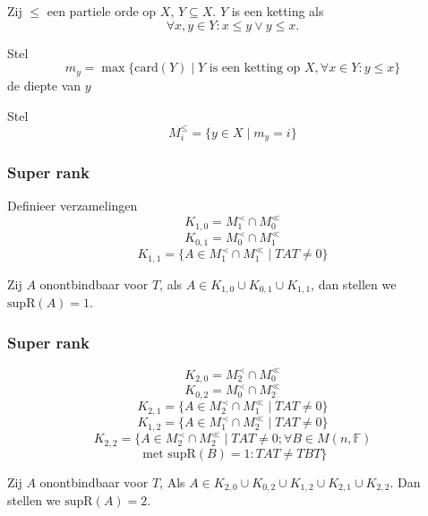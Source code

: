 \documentclass[12pt]{beamer}
\newcommand{\F}{\mathbb{F}}
\newcommand{\card}{\mathrm{card}}
\newcommand{\supR}{\mathrm{supR}}
\begin{document}
\begin{frame}
\frametitle{ $ $ }

\begin{block}{}
Zij $\leq$ een partiele orde op $X$, $Y \subseteq X$. $Y$ is een ketting als 
$$ \forall x,y \in Y : x \leq y \vee y \leq x .$$
\end{block}

\begin{block}{}
Stel 
$$m_y = \max \{ \card (Y) \; | \; Y \text{ is een ketting op } X, \forall x \in Y: y \leq x \}$$ 
de diepte van $y$
\end{block}

\begin{block}{}
Stel 
$$M_{i}^{\leq} = \{ y \in X \; | \; m_y = i\}$$
\end{block}

\end{frame}



\begin{frame}
\frametitle{Super rank}

\begin{block}{}
Definieer verzamelingen
$$K_{1,0} = M_{1}^{\prec} \cap M_{0}^{\ll}$$
$$K_{0,1} = M_{0}^{\prec} \cap M_{1}^{\ll}$$
$$K_{1,1} = \{ A \in M_{1}^{\prec} \cap M_{1}^{\ll} \; | \; TAT \neq 0  \}$$
\end{block}

\begin{block}{}
Zij $A$ onontbindbaar voor $T$, als $A \in K_{1,0} \cup K_{0,1} \cup K_{1,1}$, dan stellen we $\supR (A) = 1$.
\end{block}


\end{frame}

\begin{frame}
\frametitle{Super rank}

\begin{block}{}
$$K_{2,0} = M_{2}^{\prec} \cap M_{0}^{\ll}$$
$$K_{0,2} = M_{0}^{\prec} \cap M_{2}^{\ll}$$
$$K_{2,1} = \{ A \in M_{2}^{\prec} \cap M_{1}^{\ll} \; | \; TAT \neq 0  \}$$
$$K_{1,2} = \{ A \in M_{1}^{\prec} \cap M_{2}^{\ll} \; | \; TAT \neq 0  \}$$
$$K_{2,2} = \{ A \in M_{2}^{\prec} \cap M_{2}^{\ll} \; | \; TAT \neq 0; \forall B \in M(n,\F)$$
$$ \text{ met } \supR(B) = 1 : TAT \neq TBT \}$$
\end{block}

\begin{block}{}
Zij $A$ onontbindbaar voor $T$, Als $A \in K_{2,0} \cup K_{0,2} \cup K_{1,2} \cup K_{2,1} \cup K_{2,2}$. Dan stellen we $\supR(A) = 2$.
\end{block}

\end{frame}
\end{document}
